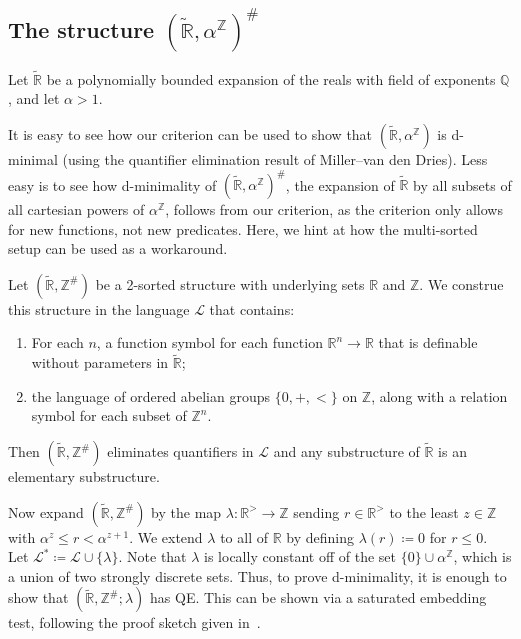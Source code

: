 \documentclass[11pt]{amsart}
\theoremstyle{plain}
\theoremstyle{definition}
\numberwithin{equation}{section}
\newcommand\Q{\mathbb{Q}}
\newcommand\R{\mathbb{R}}
\newcommand\Z{\mathbb{Z}}
\newcommand\calL{\mathcal{L}}
\newcommand\0{\varnothing}
\begin{document}
\subsection{The structure \texorpdfstring{$(\tilde{\R},\alpha^\Z)^{\#}$}{(R, αZ)\#}}\label{subsec_powersdmin}

Let $\tilde{\R}$ be a polynomially bounded expansion of the reals with field of exponents $\Q$, and let $\alpha>1$. 

\medskip\noindent
It is easy to see how our criterion can be used to show that $(\tilde{\R},\alpha^\Z)$ is d-minimal (using the quantifier elimination result of Miller--van den Dries). Less easy is to see how d-minimality of $(\tilde{\R},\alpha^\Z)^{\#}$, the expansion of $\tilde{\R}$ by all subsets of all cartesian powers of $\alpha^\Z$, follows from our criterion, as the criterion only allows for new functions, not new predicates. Here, we hint at how the multi-sorted setup can be used as a workaround.

\medskip\noindent
Let $(\tilde{\R},\Z^{\#})$ be a 2-sorted structure with underlying sets $\R$ and $\Z$. We construe this structure in the language $\calL$ that contains:
\begin{enumerate}
\item For each $n$, a function symbol for each function $\R^n\to \R$ that is definable without parameters in $\tilde{\R}$;
\item the language of ordered abelian groups $\{0,+,<\}$ on $\Z$, along with a relation symbol for each subset of $\Z^n$.
\end{enumerate}
Then $(\tilde{\R},\Z^{\#})$ eliminates quantifiers in $\calL$ and any substructure of $\tilde{\R}$ is an elementary substructure.

\medskip\noindent
Now expand $(\tilde{\R},\Z^{\#})$ by the map $\lambda\colon \R^>\to \Z$ sending $r \in \R^>$ to the least $z \in \Z$ with $\alpha^z\leq r<\alpha^{z+1}$. We extend $\lambda$ to all of $\R$ by defining $\lambda(r)\coloneqq 0$ for $r\leq 0$. Let $\calL^* \coloneqq \calL\cup\{\lambda\}$. Note that $\lambda$ is locally constant off of the set $\{0\} \cup \alpha^\Z$, which is a union of two strongly discrete sets. Thus, to prove d-minimality, it is enough to show that $(\tilde{\R},\Z^{\#};\lambda)$ has QE. This can be shown via a saturated embedding test, following the proof sketch given in~\cite[Section~8.6]{miller-tameness}.
\end{document}
